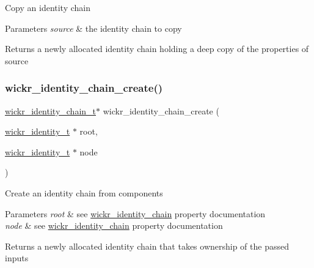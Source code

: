 Copy an identity chain


\begin{DoxyParams}{Parameters}
{\em source} & the identity chain to copy \\
\hline
\end{DoxyParams}
\begin{DoxyReturn}{Returns}
a newly allocated identity chain holding a deep copy of the properties of \textquotesingle{}source\textquotesingle{} 
\end{DoxyReturn}
\mbox{\label{group__wickr__identity_ga79551385194ba6b044b676ce5c7400e6}} 
\subsubsection{\texorpdfstring{wickr\+\_\+identity\+\_\+chain\+\_\+create()}{wickr\_identity\_chain\_create()}}
{\footnotesize\ttfamily \hyperlink{structwickr__identity__chain}{wickr\+\_\+identity\+\_\+chain\+\_\+t}$\ast$ wickr\+\_\+identity\+\_\+chain\+\_\+create (\begin{DoxyParamCaption}\item[{\hyperlink{structwickr__identity}{wickr\+\_\+identity\+\_\+t} $\ast$}]{root,  }\item[{\hyperlink{structwickr__identity}{wickr\+\_\+identity\+\_\+t} $\ast$}]{node }\end{DoxyParamCaption})}

Create an identity chain from components


\begin{DoxyParams}{Parameters}
{\em root} & see \textquotesingle{}\hyperlink{structwickr__identity__chain}{wickr\+\_\+identity\+\_\+chain}\textquotesingle{} property documentation \\
\hline
{\em node} & see \textquotesingle{}\hyperlink{structwickr__identity__chain}{wickr\+\_\+identity\+\_\+chain}\textquotesingle{} property documentation \\
\hline
\end{DoxyParams}
\begin{DoxyReturn}{Returns}
a newly allocated identity chain that takes ownership of the passed inputs 
\end{DoxyReturn}
\mbox{\label{group__wickr__identity_gadbddf6d49fddb2df103486970b3d564b}} 
